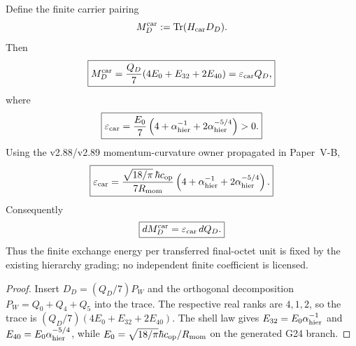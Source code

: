 \documentclass[12pt,a4paper]{article}
\begin{document}
\begin{theorem}
\label{p8:thm:v291-k48-finite-carrier-energy}
Define the finite carrier pairing
\[
 M_D^{\rm car}:=\operatorname{Tr}(H_{\rm car}D_D).
\]
Then
\[
 \boxed{
 M_D^{\rm car}
 =\frac{Q_D}{7}(4E_0+E_{32}+2E_{40})
 =\varepsilon_{\rm car}Q_D,}
\]
where
\[
 \boxed{
 \varepsilon_{\rm car}
 =\frac{E_0}{7}
 \left(4+\alpha_{\rm hier}^{-1}
 +2\alpha_{\rm hier}^{-5/4}\right)>0.}
\]
Using the v2.88/v2.89 momentum-curvature owner propagated in Paper~V-B,
\[
 \boxed{
 \varepsilon_{\rm car}
 =\frac{\sqrt{18/\pi}\,\hbar c_{\rm op}}{7R_{\rm mom}}
 \left(4+\alpha_{\rm hier}^{-1}
 +2\alpha_{\rm hier}^{-5/4}\right).}
\]
Consequently
\[
 \boxed{dM_D^{\rm car}=\varepsilon_{\rm car}\,dQ_D.}
\]
Thus the finite exchange energy per transferred final-octet unit is fixed by
the existing hierarchy grading; no independent finite coefficient is licensed.
\end{theorem}

\begin{proof}
Insert $D_D=(Q_D/7)P_W$ and the orthogonal decomposition
$P_W=Q_0+Q_4+Q_5$ into the trace.  The respective real ranks are $4,1,2$,
so the trace is $(Q_D/7)(4E_0+E_{32}+2E_{40})$.  The shell law gives
$E_{32}=E_0\alpha_{\rm hier}^{-1}$ and
$E_{40}=E_0\alpha_{\rm hier}^{-5/4}$, while
$E_0=\sqrt{18/\pi}\hbar c_{\rm op}/R_{\rm mom}$ on the generated G24 branch.
\end{proof}
\end{document}
